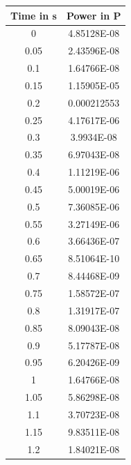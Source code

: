 \begin{minipage}{0.5\textwidth}
    \center
        \begin{tabular}{|c|c|}
            \hline
            Time in s & Power in P\\
            \hline
            0 & 4.85128E-08\\
            \hline
            0.05 & 2.43596E-08\\
            \hline
            0.1	& 1.64766E-08\\
            \hline
            0.15 & 1.15905E-05\\
            \hline
            0.2	& 0.000212553\\
            \hline
            0.25 & 4.17617E-06\\
            \hline
            0.3	& 3.9934E-08\\
            \hline
            0.35 & 6.97043E-08\\
            \hline
            0.4	& 1.11219E-06\\
            \hline
            0.45 & 5.00019E-06\\
            \hline
            0.5	& 7.36085E-06\\
            \hline
            0.55 & 3.27149E-06\\
            \hline
            0.6	& 3.66436E-07\\
            \hline
            0.65 & 8.51064E-10\\
            \hline
            0.7	& 8.44468E-09\\
            \hline
            0.75 & 1.58572E-07\\
            \hline
            0.8	& 1.31917E-07\\
            \hline
            0.85 & 8.09043E-08\\
            \hline
            0.9	& 5.17787E-08\\
            \hline
            0.95 & 6.20426E-09\\
            \hline
            1 & 1.64766E-08\\
            \hline
            1.05 & 5.86298E-08\\
            \hline
            1.1	& 3.70723E-08\\
            \hline
            1.15 & 9.83511E-08\\
            \hline
            1.2	& 1.84021E-08\\
            \hline
        \end{tabular}
        \label{Tab:Values of Power Graph 2}
\end{minipage}
